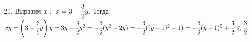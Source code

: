 21. Выразим $x:\ x=3-\cfrac{3}{2}y.$ Тогда $xy=\left(3-\cfrac{3}{2}y\right)y=3y-\cfrac{3}{2}y^2=-\cfrac{3}{2}(y^2-2y)=
-\cfrac{3}{2}((y-1)^2-1)=-\cfrac{3}{2}(y-1)^2+\cfrac{3}{2}\leqslant\cfrac{3}{2}.$\\
